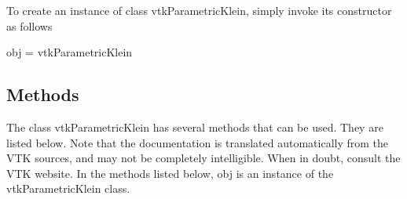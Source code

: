 To create an instance of class vtk\-Parametric\-Klein, simply invoke its constructor as follows \begin{DoxyVerb}  obj = vtkParametricKlein
\end{DoxyVerb}
 \hypertarget{vtkwidgets_vtkxyplotwidget_Methods}{}\subsection{Methods}\label{vtkwidgets_vtkxyplotwidget_Methods}
The class vtk\-Parametric\-Klein has several methods that can be used. They are listed below. Note that the documentation is translated automatically from the V\-T\-K sources, and may not be completely intelligible. When in doubt, consult the V\-T\-K website. In the methods listed below, {\ttfamily obj} is an instance of the vtk\-Parametric\-Klein class. 
